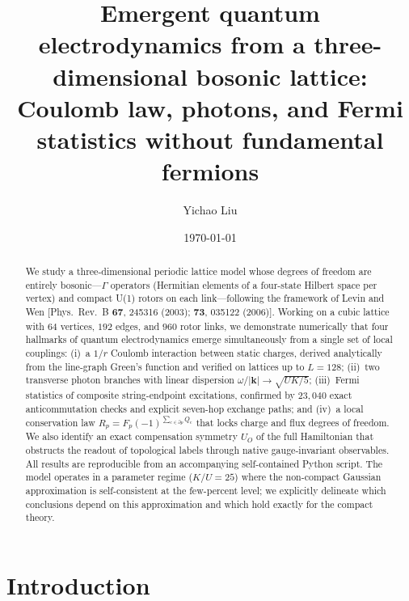 \documentclass[aps,prb,twocolumn,superscriptaddress,showpacs]{revtex4-2}
\begin{document}
\title{Emergent quantum electrodynamics from a three-dimensional bosonic lattice:\\
Coulomb law, photons, and Fermi statistics without fundamental fermions}

\author{Yichao Liu}

\date{\today}

\begin{abstract}
We study a three-dimensional periodic lattice model whose degrees of freedom
are entirely bosonic---$\Gamma$ operators (Hermitian elements of a four-state
Hilbert space per vertex) and compact U(1) rotors on each link---following the
framework of Levin and Wen [Phys.\ Rev.\ B \textbf{67}, 245316 (2003);
\textbf{73}, 035122 (2006)]. Working on a cubic lattice with $64$ vertices,
$192$ edges, and $960$ rotor links, we demonstrate numerically that four
hallmarks of quantum electrodynamics emerge simultaneously from a single set
of local couplings: (i)~a $1/r$ Coulomb interaction between static charges,
derived analytically from the line-graph Green's function and verified on
lattices up to $L=128$; (ii)~two transverse photon branches with linear
dispersion $\omega/|\mathbf{k}|\to\sqrt{UK/5}$; (iii)~Fermi statistics of
composite string-endpoint excitations, confirmed by $23{,}040$ exact
anticommutation checks and explicit seven-hop exchange paths; and (iv)~a local
conservation law $R_p = F_p(-1)^{\sum_{e\in\partial p}Q_e}$ that locks charge
and flux degrees of freedom. We also identify an exact compensation symmetry
$U_O$ of the full Hamiltonian that obstructs the readout of topological
labels through native gauge-invariant observables. All results are
reproducible from an accompanying self-contained Python script. The model
operates in a parameter regime ($K/U=25$) where the non-compact Gaussian
approximation is self-consistent at the few-percent level; we explicitly
delineate which conclusions depend on this approximation and which hold
exactly for the compact theory.
\end{abstract}

\maketitle

\section{Introduction}
\label{sec:intro}
\end{document}
